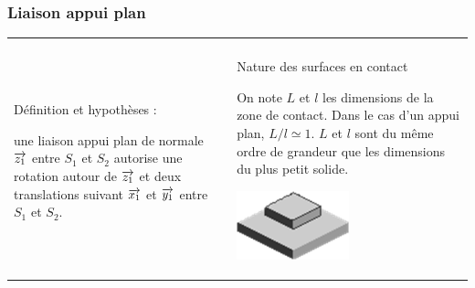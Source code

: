 \documentclass[10pt,oneside]{article}
\begin{document}
\subsubsection{Liaison appui plan}
\begin{center}
\begin{tabular}{p{} c p{}}
\hline
& &\\
Définition et hypothèses : 

une liaison appui plan de normale $\overrightarrow{z_1}$ entre $S_1$ et $S_2$ autorise une rotation autour de $\overrightarrow{z_1}$ et deux translations suivant $\overrightarrow{x_1}$ et $\overrightarrow{y_1}$ entre $S_1$ et $S_2$. 
&& Nature des surfaces en contact 

On note $L$ et $l$ les dimensions de la zone de contact. Dans le cas d'un appui plan, $L/l\simeq 1$. $L$ et $l$ sont du même ordre de grandeur que les dimensions du plus petit solide.

\includegraphics[height=2cm]{png/plan_s} 
\\


\end{tabular}
\end{center}
\end{document}
